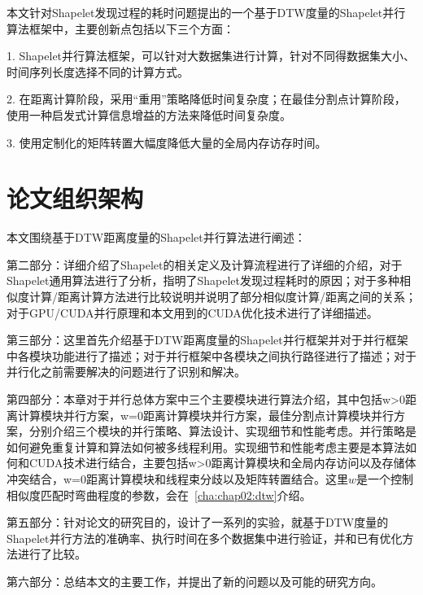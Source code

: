 本文针对Shapelet发现过程的耗时问题提出的一个基于DTW度量的Shapelet并行算法框架中，主要创新点包括以下三个方面：

1. Shapelet并行算法框架，可以针对大数据集进行计算，针对不同得数据集大小、时间序列长度选择不同的计算方式。

2. 在距离计算阶段，采用“重用”策略降低时间复杂度；在最佳分割点计算阶段，使用一种启发式计算信息增益的方法来降低时间复杂度。

3. 使用定制化的矩阵转置大幅度降低大量的全局内存访存时间。

\section{论文组织架构}

本文围绕基于DTW距离度量的Shapelet并行算法进行阐述：

第二部分：详细介绍了Shapelet的相关定义及计算流程进行了详细的介绍，对于Shapelet通用算法进行了分析，指明了Shapelet发现过程耗时的原因；对于多种相似度计算/距离计算方法进行比较说明并说明了部分相似度计算/距离之间的关系；对于GPU/CUDA并行原理和本文用到的CUDA优化技术进行了详细描述。

第三部分：这里首先介绍基于DTW距离度量的Shapelet并行框架并对于并行框架中各模块功能进行了描述；对于并行框架中各模块之间执行路径进行了描述；对于并行化之前需要解决的问题进行了识别和解决。

第四部分：本章对于并行总体方案中三个主要模块进行算法介绍，其中包括w>0距离计算模块并行方案，w=0距离计算模块并行方案，最佳分割点计算模块并行方案，分别介绍三个模块的并行策略、算法设计、实现细节和性能考虑。并行策略是如何避免重复计算和算法如何被多线程利用。实现细节和性能考虑主要是本算法如何和CUDA技术进行结合，主要包括w>0距离计算模块和全局内存访问以及存储体冲突结合，w=0距离计算模块和线程束分歧以及矩阵转置结合。这里$w$是一个控制相似度匹配时弯曲程度的参数，会在~\ref{cha:chap02:dtw}介绍。

第五部分：针对论文的研究目的，设计了一系列的实验，就基于DTW度量的Shapelet并行方法的准确率、执行时间在多个数据集中进行验证，并和已有优化方法进行了比较。

第六部分：总结本文的主要工作，并提出了新的问题以及可能的研究方向。

